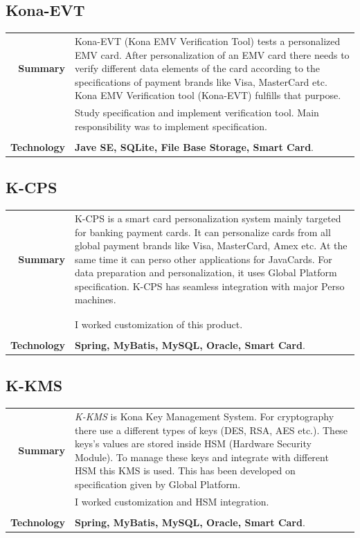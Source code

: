 \documentclass[a4paper,10pt]{article}
\begin{document}
\subsection*{Kona-EVT}
\begin{tabular}{r|p{13cm}}
\textbf{Summary}&Kona-EVT (Kona EMV Verification Tool) tests a personalized EMV card. After personalization of an EMV card there needs to verify different data elements of the card according to the specifications of payment brands like Visa, MasterCard etc. Kona EMV Verification tool (Kona-EVT) fulfills that purpose.
\\&Study specification and implement verification tool. Main responsibility was to implement specification.\\\\
\textbf{Technology}& \textbf{Jave SE, SQLite, File Base Storage, Smart Card}.
\end{tabular}

\subsection*{K-CPS}
\begin{tabular}{r|p{13cm}}
\textbf{Summary}&K-CPS is a smart card personalization system mainly targeted for banking payment cards. It can personalize cards from all global payment brands like Visa, MasterCard, Amex etc. At the same time it can perso other applications for JavaCards. For data preparation and personalization, it uses Global Platform specification. K-CPS has seamless integration with major Perso machines.\\\\
\\&I worked customization of this product. \\\\
\textbf{Technology}& \textbf{Spring, MyBatis, MySQL, Oracle, Smart Card}.
\end{tabular}

\subsection*{K-KMS}
\begin{tabular}{r|p{13cm}}
\textbf{Summary}&\emph{K-KMS} is Kona Key Management System. For cryptography there use a different types of keys (DES, RSA, AES etc.). These keys's values are stored inside HSM (Hardware Security Module). To manage these keys and integrate with different HSM this KMS is used. This has been developed on specification given by Global Platform.
\\&I worked customization and HSM integration. \\\\
\textbf{Technology}& \textbf{Spring, MyBatis, MySQL, Oracle, Smart Card}.
\end{tabular}
\end{document}
